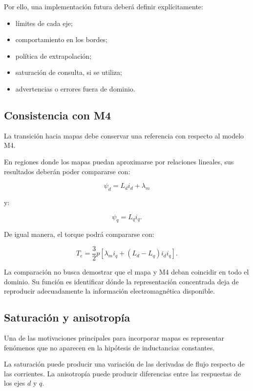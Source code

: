 Por ello, una implementación futura deberá definir explícitamente:

\begin{itemize}
\item límites de cada eje;
\item comportamiento en los bordes;
\item política de extrapolación;
\item saturación de consulta, si se utiliza;
\item advertencias o errores fuera de dominio.
\end{itemize}

\subsection{Consistencia con M4}

La transición hacia mapas debe conservar una referencia con respecto al modelo M4.

En regiones donde los mapas puedan aproximarse por relaciones lineales, sus resultados deberán poder compararse con:

\begin{equation}
\psi_d=L_di_d+\lambda_m
\end{equation}

y:

\begin{equation}
\psi_q=L_qi_q.
\end{equation}

De igual manera, el torque podrá compararse con:

\begin{equation}
T_e=
\frac{3}{2}p
\left[
\lambda_mi_q+
(L_d-L_q)i_di_q
\right].
\end{equation}

La comparación no busca demostrar que el mapa y M4 deban coincidir en todo el dominio. Su función es identificar dónde la representación concentrada deja de reproducir adecuadamente la información electromagnética disponible.

\subsection{Saturación y anisotropía}

Una de las motivaciones principales para incorporar mapas es representar fenómenos que no aparecen en la hipótesis de inductancias constantes.

La saturación puede producir una variación de las derivadas de flujo respecto de las corrientes. La anisotropía puede producir diferencias entre las respuestas de los ejes $d$ y $q$.

